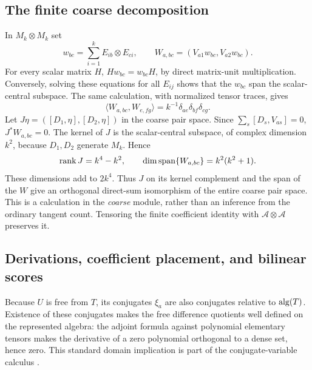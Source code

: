\documentclass[11pt]{article}
\theoremstyle{definition}\newtheorem{definition}[theorem]{Definition}
\theoremstyle{remark}\newtheorem{remark}[theorem]{Remark}
\begin{document}
\subsection{The finite coarse decomposition}
In $M_k\otimes M_k$ set
\[
 w_{bc}=\sum_{i=1}^k E_{ib}\otimes E_{ci},\qquad
 W_{a,bc}=(V_{a1}w_{bc},V_{a2}w_{bc}).
\]
For every scalar matrix $H$, $Hw_{bc}=w_{bc}H$, by direct
matrix-unit multiplication. Conversely, solving these equations for
all $E_{ij}$ shows that the $w_{bc}$ span the scalar-central subspace.
The same calculation, with normalized tensor traces, gives
\begin{equation}\label{eq:gram}
 \langle W_{a,bc},W_{e,fg}\rangle
 =k^{-1}\delta_{ae}\delta_{bf}\delta_{cg}.
\end{equation}
Let $J\eta=([D_1,\eta],[D_2,\eta])$ in the coarse pair space.
Since $\sum_s[D_s,V_{as}]=0$, $J^*W_{a,bc}=0$.
The kernel of $J$ is the scalar-central subspace, of complex dimension
$k^2$, because $D_1,D_2$ generate $M_k$. Hence
\[
 \operatorname{rank} J=k^4-k^2,\qquad
 \dim\operatorname{span}\{W_{a,bc}\}=k^2(k^2+1).
\]
These dimensions add to $2k^4$. Thus $J$ on its kernel complement and
the span of the $W$ give an orthogonal direct-sum isomorphism of the
entire coarse pair space. This is a calculation in the \emph{coarse}
module, rather than an inference from the ordinary tangent count.
Tensoring the finite coefficient identity with
$\mathcal A\otimes\mathcal A$ preserves it.

\subsection{Derivations, coefficient placement, and bilinear scores}
Because $U$ is free from $T$, its conjugates $\xi_a$ are also conjugates
relative to $\operatorname{alg}(T)$. Existence of these conjugates makes the free
difference quotients well defined on the represented algebra: the
adjoint formula against polynomial elementary tensors makes the
derivative of a zero polynomial orthogonal to a dense set, hence zero.
This standard domain implication is part of the conjugate-variable
calculus \cite{Vstar}.
\end{document}
